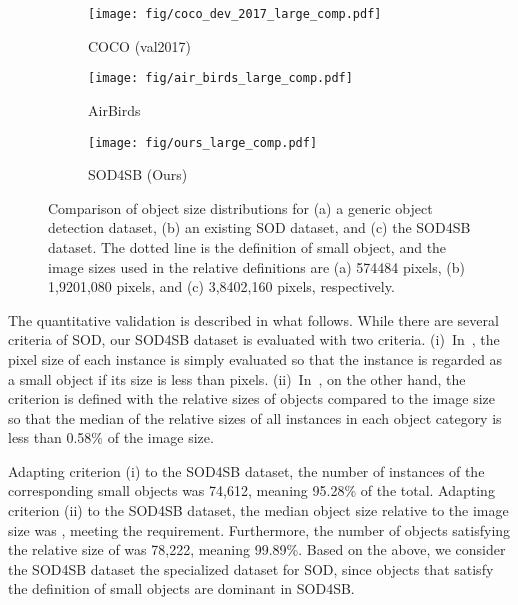 \documentclass{mva_style}
\begin{document}
\begin{figure*}[t]
    \centering
    \small
    \begin{subfigure}[b]{0.329\textwidth}
        \centering
        \texttt{[image: fig/coco\_dev\_2017\_large\_comp.pdf]}
        \caption{COCO (val2017)~\cite{COCO_ECCV2014}}
        \label{fig:coco_distribution}
    \end{subfigure}
    \hfill
    \begin{subfigure}[b]{0.329\textwidth}
        \centering
        \texttt{[image: fig/air\_birds\_large\_comp.pdf]}
        \caption{AirBirds~\cite{sun2022airbirds}}
        \label{fig:air_birds_distribution}
    \end{subfigure}
    \hfill
    \begin{subfigure}[b]{0.329\textwidth}
        \centering
        \texttt{[image: fig/ours\_large\_comp.pdf]}
        \caption{SOD4SB (Ours)}
        \label{fig:sod4sb_distribution}
    \end{subfigure}
    \caption{Comparison of object size distributions for (a) a generic object detection dataset, (b) an existing SOD dataset, and (c) the SOD4SB dataset. The dotted line is the definition of small object, and the image sizes used in the relative definitions are (a) 574484 pixels, (b) 1,9201,080 pixels, and (c) 3,8402,160 pixels, respectively.}
    \label{fig:dataset_comparison}
\end{figure*}

The quantitative validation is described in what follows.
While there are several criteria of SOD, our SOD4SB dataset is evaluated with two criteria.
(i)~In~\cite{torralba200880, zhu2016traffic}, the pixel size of each instance is simply evaluated so that the instance is regarded as a small object if its size is less than pixels.
(ii)~In~\cite{chen2017r}, on the other hand, the criterion is defined with the relative sizes of objects compared to the image size so that the median of the relative sizes of all instances in each object category is less than 0.58\% of the image size.

Adapting criterion (i) to the SOD4SB dataset, the number of instances of the corresponding small objects was 74,612, meaning 95.28\% of the total.
Adapting criterion (ii) to the SOD4SB dataset, the median object size relative to the image size was , meeting the requirement. Furthermore, the number of objects satisfying the relative size of  was 78,222, meaning 99.89\%. Based on the above, we consider the SOD4SB dataset the specialized dataset for SOD, since objects that satisfy the definition of small objects are dominant in SOD4SB. 
\end{document}
